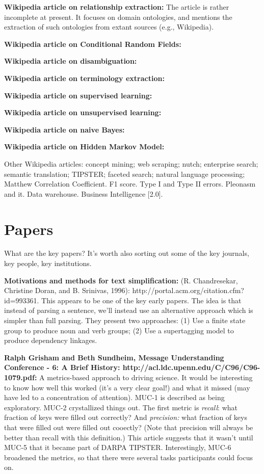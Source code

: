 \textbf{Wikipedia article on relationship extraction:} The article is
rather incomplete at present.  It focuses on domain ontologies, and
mentions the extraction of such ontologies from extant sources (e.g.,
Wikipedia).

\textbf{Wikipedia article on Conditional Random Fields:}

\textbf{Wikipedia article on disambiguation:}

\textbf{Wikipedia article on terminology extraction:}

\textbf{Wikipedia article on supervised learning:}

\textbf{Wikipedia article on unsupervised learning:}

\textbf{Wikipedia article on naive Bayes:}

\textbf{Wikipedia article on Hidden Markov Model:}


Other Wikipedia articles: concept mining; web scraping; nutch;
enterprise search; semantic translation; TIPSTER; faceted search;
natural language processing; Matthew Correlation Coefficient. F1
score.  Type I and Type II errors.  Pleonasm and it.  Data warehouse.
Business Intelligence [2.0].

\section{Papers}

What are the key papers?  It's worth also sorting out some of the key
journals, key people, key institutions.

\textbf{Motivations and methods for text simplification:}
(R. Chandresekar, Christine Doran, and B. Srinivas, 1996):
http://portal.acm.org/citation.cfm?id=993361.  This appears to be one
of the key early papers.  The idea is that instead of parsing a
sentence, we'll instead use an alternative approach which is simpler
than full parsing.  They present two approaches: (1) Use a finite
state group to produce noun and verb groups; (2) Use a supertagging
model to produce dependency linkages.

\textbf{Ralph Grisham and Beth Sundheim, Message Understanding
  Conference - 6: A Brief History:
  http://acl.ldc.upenn.edu/C/C96/C96-1079.pdf:} A metrics-based
approach to driving science.  It would be interesting to know how well
this worked (it's a very clear goal!) and what it missed (may have led
to a concentration of attention).  MUC-1 is described as being
exploratory.  MUC-2 crystallized things out.  The first metric is
\emph{recall}: what fraction of keys were filled out correctly?  And
\emph{precision:} what fraction of keys that were filled out were
filled out cooectly?  (Note that precision will always be better than
recall with this definition.)  This article suggests that it wasn't
until MUC-5 that it became part of DARPA TIPSTER.  Interestingly,
MUC-6 broadened the metrics, so that there were several tasks
participants could focus on.

